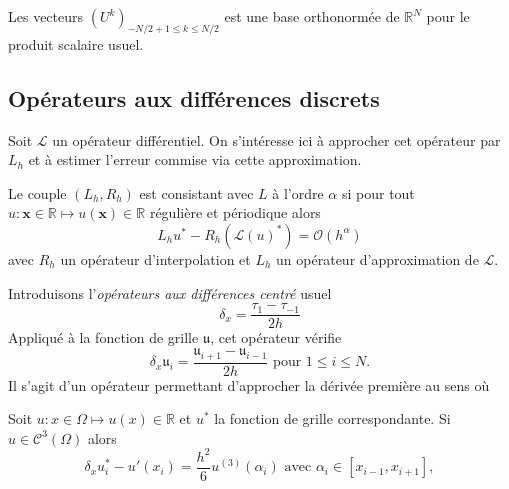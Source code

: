 Les vecteurs $(U^k)_{-N/2+1 \leq k \leq N/2}$ est une base orthonormée de $\mathbb{R}^N$ pour le produit scalaire usuel.



















\subsection{Opérateurs aux différences discrets}

Soit $\mathcal{L}$ un opérateur différentiel. On s'intéresse ici à approcher cet opérateur par $L_h$ et à estimer l'erreur commise via cette approximation.

\begin{definition}
Le couple $(L_h, R_h)$ est consistant avec $L$ à l'ordre $\alpha$ si pour tout $u : \mathbf{x} \in \mathbb{R} \mapsto u(\mathbf{x}) \in \mathbb{R}$ régulière et périodique alors 
\begin{equation}
L_h u^* - R_h (\mathcal{L}(u)^*) = \mathcal{O} \left ( h^{\alpha} \right)
\end{equation}
avec $R_h$ un opérateur d'interpolation et $L_h$ un opérateur d'approximation de $\mathcal{L}$.
\end{definition}





Introduisons l'\textit{opérateurs aux différences centré} usuel
\begin{equation}
\delta_x = \dfrac{\tau_1 - \tau_{-1}}{2h}
\end{equation}
Appliqué à la fonction de grille $\mathfrak{u}$, cet opérateur vérifie 
\begin{equation}
\delta_x \mathfrak{u}_i = \dfrac{\mathfrak{u}_{i+1} - \mathfrak{u}_{i-1}}{2h} \text{ pour } 1 \leq i \leq N.
\end{equation}
Il s'agit d'un opérateur permettant d'approcher la dérivée première au sens où

\begin{proposition}
Soit $u: x \in \Omega \mapsto u(x) \in \mathbb{R}$ et $u^*$ la fonction de grille correspondante. Si $u \in \mathcal{C}^3 (\Omega)$ alors 
\begin{equation}
\delta_x u^*_i - u'(x_i) = \dfrac{h^2}{6} u^{(3)}(\alpha_i) \text{ avec } \alpha_i \in [x_{i-1}, x_{i+1}],
\end{equation}
\end{proposition}

